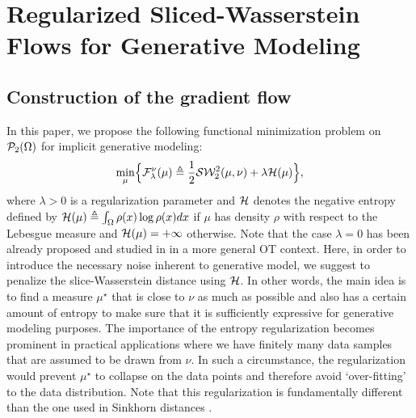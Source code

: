 
\section{Regularized Sliced-Wasserstein Flows for Generative Modeling}





\subsection{Construction of the gradient flow}



%

In this paper, we propose the following functional minimization problem on ${\cal P}_2(\Omega)$ for implicit generative modeling:
\begin{equation}
 \min_{\mu} \Bigl\{ {\cal F}^{\nu}_\lambda(\mu) \triangleq  \frac1{2} {\cal S}{\cal W}_2^2(\mu, \nu) + \lambda {\cal H}(\mu) \Bigr\},  \label{eqn:sw_optim}
\end{equation}
where $\lambda >0$ is a regularization parameter and ${\cal H}$ denotes the negative entropy defined by ${\cal H}(\mu) \triangleq \int_{\Omega} \rho(x) \log \rho(x) dx $ if $\mu$ has density $\rho$ with respect to the Lebesgue measure and ${\cal H}(\mu) = + \infty$ otherwise. Note that the case $\lambda =0$ has been already proposed and studied in \cite{bonnotte2013unidimensional} in a more general OT context. Here, in order to introduce the necessary noise inherent to generative model, we suggest to penalize the slice-Wasserstein distance using ${\cal H}$. In other words, the main idea is to find a measure $\mu^\star$ that is close to $\nu$ as much as possible and also has a certain amount of entropy to make sure that it is sufficiently expressive for generative modeling purposes.
The importance of the entropy regularization becomes prominent in practical applications where we have finitely many data samples that are assumed to be drawn from $\nu$. In such a circumstance, the regularization would prevent $\mu^\star$ to collapse on the data points and therefore avoid `over-fitting' to the data distribution. Note that this regularization is fundamentally different than the one used in Sinkhorn distances \cite{genevay2018learning}.


